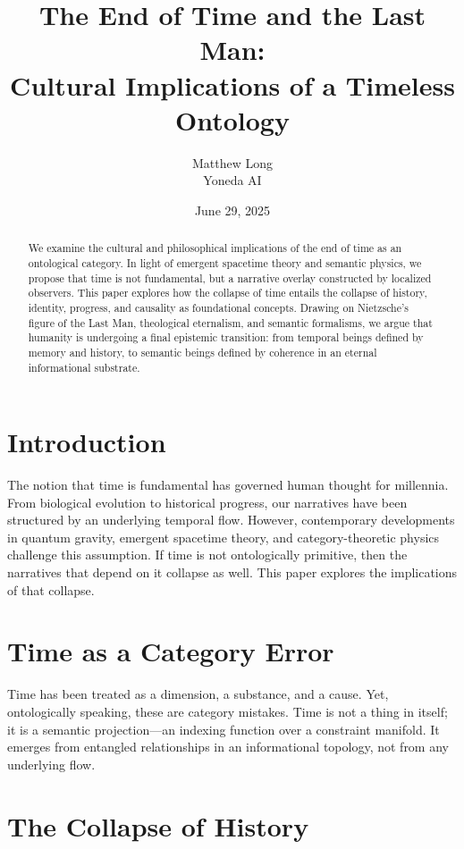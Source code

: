 \documentclass[12pt]{article}
\title{\textbf{The End of Time and the Last Man:\\Cultural Implications of a Timeless Ontology}}
\author{Matthew Long\\Yoneda AI}
\date{June 29, 2025}
\begin{document}
\maketitle

\begin{abstract}
We examine the cultural and philosophical implications of the end of time as an ontological category. In light of emergent spacetime theory and semantic physics, we propose that time is not fundamental, but a narrative overlay constructed by localized observers. This paper explores how the collapse of time entails the collapse of history, identity, progress, and causality as foundational concepts. Drawing on Nietzsche's figure of the Last Man, theological eternalism, and semantic formalisms, we argue that humanity is undergoing a final epistemic transition: from temporal beings defined by memory and history, to semantic beings defined by coherence in an eternal informational substrate.
\end{abstract}

\section{Introduction}

The notion that time is fundamental has governed human thought for millennia. From biological evolution to historical progress, our narratives have been structured by an underlying temporal flow. However, contemporary developments in quantum gravity, emergent spacetime theory, and category-theoretic physics challenge this assumption. If time is not ontologically primitive, then the narratives that depend on it collapse as well. This paper explores the implications of that collapse.

\section{Time as a Category Error}

Time has been treated as a dimension, a substance, and a cause. Yet, ontologically speaking, these are category mistakes. Time is not a thing in itself; it is a semantic projection—an indexing function over a constraint manifold. It emerges from entangled relationships in an informational topology, not from any underlying flow.

\section{The Collapse of History}
\end{document}
